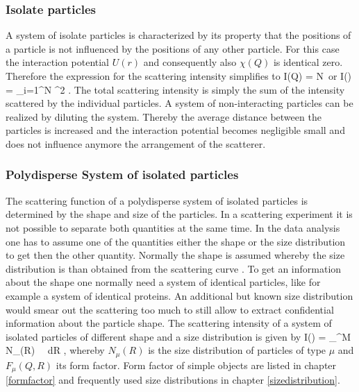 \subsubsection{Isolate particles}

A system of isolate particles is characterized by its property that the positions of a particle is not influenced
by the positions of any other particle. For this case the interaction potential $U(r)$ and consequently also  $\chi(Q)$
is identical zero. Therefore the expression for the scattering intensity simplifies to
\BE
               I(Q) = N\, 
\quad \mbox{or} \quad  I() = \sum_{i=1}^{N} ^2 .
\EE
The total scattering intensity is simply the sum of the intensity scattered by the individual particles.
A system of non-interacting particles can be realized by diluting the system. Thereby the average distance
between the particles is increased and the interaction potential becomes negligible small and does not
influence anymore the arrangement of the scatterer.

\subsubsection{Polydisperse System of isolated particles}

The scattering function of a polydisperse system of isolated
particles is determined by the shape and size of the particles. In
a scattering experiment it is not possible to separate both
quantities at the same time. In the data analysis one has to
assume one of the quantities either the shape or the size
distribution to get then the other quantity. Normally the shape is
assumed whereby the size distribution is than obtained from the
scattering curve \cite{scatt75,scatt121}. To get an information
about the shape one normally need a system of identical particles,
like for example a system of identical proteins. An additional but
known size distribution would smear out the scattering too much to
still allow to extract confidential information about the particle
shape. The scattering intensity of a system of isolated particles
of different shape and a size distribution is given by
\BE I() = \sum_{}^M \int N_{\mu}(R) \,
            \, dR ,
\label{eq:N(R)F(QR)}
\EE
whereby $N_{\mu}(R)$ is the size distribution of particles of type $\mu$
and  $F_{\mu}(Q,R)$ its form factor. Form factor of simple objects are
listed in chapter \ref{formfactor} and frequently used size distributions
in chapter \ref{sizedistribution}.

